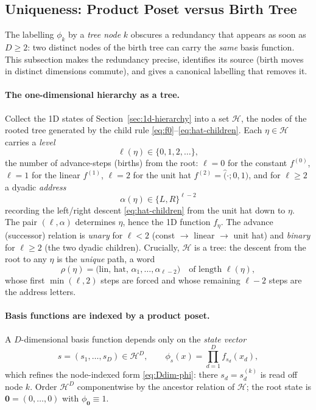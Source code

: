 \documentclass[11pt]{article}
\begin{document}
\subsection{Uniqueness: Product Poset versus Birth Tree}
\label{sec:uniqueness}

The labelling $\phi_k$ by a \emph{tree node} $k$ obscures a redundancy that
appears as soon as $D\ge 2$: two distinct nodes of the birth tree can carry the
\emph{same} basis function.  This subsection makes the redundancy precise,
identifies its source (birth moves in distinct dimensions commute), and gives a
canonical labelling that removes it.

\paragraph{The one-dimensional hierarchy as a tree.}
Collect the 1D states of Section~\ref{sec:1d-hierarchy} into a set $\mathcal{H}$,
the nodes of the rooted tree generated by the child rule
\eqref{eq:f0}--\eqref{eq:hat-children}.  Each $\eta\in\mathcal{H}$ carries a
\emph{level}
\begin{equation}
  \ell(\eta) \in \{0,1,2,\dots\},
\end{equation}
the number of advance-steps (births) from the root: $\ell=0$ for the constant
$f^{(0)}$, $\ell=1$ for the linear $f^{(1)}$, $\ell=2$ for the unit hat
$f^{(2)}=\hat(\cdot;0,1)$, and for $\ell\ge 2$ a dyadic \emph{address}
\begin{equation}
  \alpha(\eta)\in\{L,R\}^{\ell-2}
\end{equation}
recording the left/right descent \eqref{eq:hat-children} from the unit hat down
to $\eta$.  The pair $(\ell,\alpha)$ determines $\eta$, hence the 1D function
$f_\eta$.  The advance (successor) relation is \emph{unary} for $\ell<2$ (const
$\to$ linear $\to$ unit hat) and \emph{binary} for $\ell\ge2$ (the two dyadic
children).  Crucially, $\mathcal{H}$ is a tree: the descent from the root to any
$\eta$ is the \emph{unique} path, a word
\begin{equation}
  \rho(\eta)
  = \bigl(\text{lin},\,\text{hat},\,\alpha_1,\dots,\alpha_{\ell-2}\bigr)
  \quad\text{of length } \ell(\eta),
  \label{eq:descent-word}
\end{equation}
whose first $\min(\ell,2)$ steps are forced and whose remaining $\ell-2$ steps
are the address letters.

\paragraph{Basis functions are indexed by a product poset.}
A $D$-dimensional basis function depends only on the \emph{state vector}
\begin{equation}
  s = (s_1,\dots,s_D) \in \mathcal{H}^D,
  \qquad
  \phi_s(x) = \prod_{d=1}^D f_{s_d}(x_d),
  \label{eq:phi-state}
\end{equation}
which refines the node-indexed form \eqref{eq:Ddim-phi}: there $s_d=s_d^{(k)}$
is read off node $k$.  Order $\mathcal{H}^D$ componentwise by the ancestor
relation of $\mathcal{H}$; the root state is $\mathbf{0}=(0,\dots,0)$ with
$\phi_{\mathbf 0}\equiv 1$.
\end{document}
